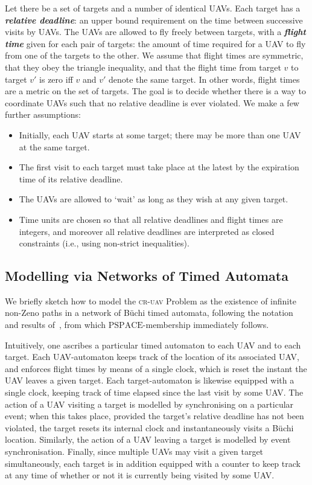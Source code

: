 \documentclass[envcountsame]{llncs}
\begin{document}
Let there be a set of targets and a number of identical UAVs.  Each
target has a \emph{\textbf{relative deadline}}: an upper bound
requirement on the time between successive visits by UAVs.  The UAVs
are allowed to fly freely between targets, with a \emph{\textbf{flight
    time}} given for each pair of targets: the amount of time
required for a UAV to fly from one of the targets to the other. We
assume that flight times are symmetric, that they obey the triangle
inequality, and that the flight time from target $v$ to target $v'$ is
zero iff $v$ and $v'$ denote the same target. In other words, flight
times are a metric on the set of targets. The goal is to decide
whether there is a way to coordinate UAVs such that no relative
deadline is ever violated. We make a few further assumptions:
\begin{itemize}
\item Initially, each UAV starts at some target; there may be more
  than one UAV at the same target.
\item The first visit to each target must take place at the latest by
  the expiration time of its relative deadline.
\item The UAVs are allowed to `wait' as long as they wish at any given
  target. 
\item Time units are chosen so that all relative deadlines and flight
  times are integers, and moreover all relative deadlines are
  interpreted as closed constraints (i.e., using non-strict inequalities).
\end{itemize}


\subsection{Modelling via Networks of Timed Automata}\label{subsec:membership}

We briefly sketch how to model the \textsc{cr-uav} Problem as the
existence of infinite non-Zeno paths in a network of B\"uchi timed
automata, following the notation and results of~\cite{Alur1998}, from
which $\mathrm{PSPACE}$-membership immediately follows.

Intuitively, one ascribes a particular timed automaton to each UAV and
to each target. Each UAV-automaton keeps track of the location of its
associated UAV, and enforces flight times by means of a single clock,
which is reset the instant the UAV leaves a given target. Each
target-automaton is likewise equipped with a single clock, keeping
track of time elapsed since the last visit by some UAV\@. The action
of a UAV visiting a target is modelled by synchronising on a
particular event; when this takes place, provided the target's
relative deadline has not been violated, the target resets its
internal clock and instantaneously visits a B\"uchi
location. Similarly, the action of a UAV leaving a target is modelled
by event synchronisation. Finally, since multiple UAVs may visit a
given target simultaneously, each target is in addition equipped with
a counter to keep track at any time of whether or not it is currently
being visited by some UAV.
\end{document}
